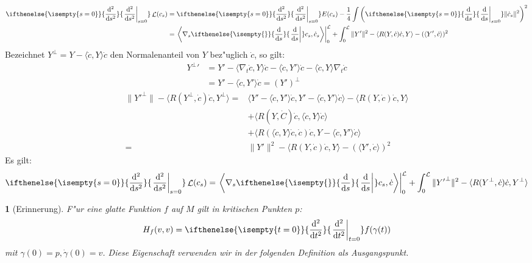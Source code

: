 \documentclass[paper=A4, twoside, chapterprefix=true, bibliography=totoc, headsepline]{scrbook}
\DeclareMathOperator{\calL}{\mathcal{L}}
\newcommand{\dop}{\mathrm{d}}
\newcommand{\difffrac}[3][]{\ifthenelse{\isempty{#1}}{\frac{\dop #2}{\dop #3}}{\left. \frac{\dop #2}{\dop #3} \right|_{#1}}}
\theoremstyle{plain}
\theoremstyle{nonumberplain}
\theoremstyle{empty}
\newtheorem{emptythm}{}%
\theoremstyle{break}
\begin{document}
\begin{align*}
  \difffrac[s=0]{^2}{s^2} \calL(c_s) &= \difffrac[s=0]{^2}{s^2} E(c_s) - \frac{1}{4} \int \left( \difffrac[s=0]{}{s} \| \dot c_s \|^2 \right)^2 \\
  &= \left.\left\langle \nabla_s \difffrac{}{s} c_s, \dot c_s
    \right\rangle\right|_{0}^{\calL} + \int_0^{\calL} \| Y' \|^2 -
  \langle R(Y, \dot c) \dot c, Y \rangle - ( \langle Y', \dot c
  \rangle )^2
\end{align*}
Bezeichnet $Y^\perp = Y - \langle \dot c, Y \rangle \dot c$ den
Normalenanteil von $Y$ bez"uglich $\dot c$, so gilt:
\begin{align*}
  {Y^\perp}' &= Y' - \langle \nabla_t \dot c, Y \rangle \dot c - \langle \dot c, Y' \rangle \dot c - \langle \dot c, Y \rangle \nabla_t \dot c \\
  &= Y' - \langle \dot c, Y' \rangle \dot c = (Y')^\perp
\end{align*}
\begin{align*}
  \| {Y'}^\perp \| - \langle R(Y^\perp, \dot c) \dot c, Y^\perp \rangle ={}& \langle Y' - \langle \dot c, Y' \rangle \dot c, Y' - \langle \dot c, Y' \rangle \dot c \rangle - \langle R(Y, \dot c) \dot c, Y \rangle \\
  & + \langle R(Y, \dot C) \dot c, \langle \dot c, Y \rangle \dot c \rangle \\
  & + \langle R ( \langle \dot c, Y \rangle \dot c, \dot c) \dot c, Y - \langle \dot c, Y' \rangle \dot c \rangle \\
  ={}& \| Y' \|^2 - \langle R(Y, \dot c) \dot c, Y \rangle - ( \langle
  Y', \dot c \rangle )^2
\end{align*}
Es gilt:
\begin{align*}
  \difffrac[s=0]{^2}{s^2} \calL(c_s) = \left.\left\langle \nabla_s
      \difffrac{}{s} c_s, \dot c \right\rangle\right|_{0}^{\calL} +
  \int_0^{\calL} \| {Y'}^\perp \|^2 - \langle R(Y^\perp, \dot c) \dot
  c, Y^\perp \rangle
\end{align*}


\begin{emptythm}[Erinnerung]
  F"ur eine glatte Funktion $f$ auf $M$ gilt in kritischen Punkten $p$:
  \begin{align*}
    H_f(v,v) = \difffrac[t=0]{^2}{t^2}f(\gamma(t))
  \end{align*}
  mit $\gamma(0) = p, \dot\gamma(0) = v$.
  Diese Eigenschaft verwenden wir in der folgenden Definition als Ausgangspunkt.
\end{emptythm}
\end{document}
